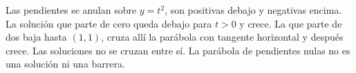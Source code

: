 Las pendientes se anulan sobre \(y=t^2\), son positivas debajo y negativas encima. La solución que parte de cero queda debajo para \(t>0\) y crece. La que parte de dos baja hasta \((1,1)\), cruza allí la parábola con tangente horizontal y después crece. Las soluciones no se cruzan entre sí. La parábola de pendientes nulas no es una solución ni una barrera.
